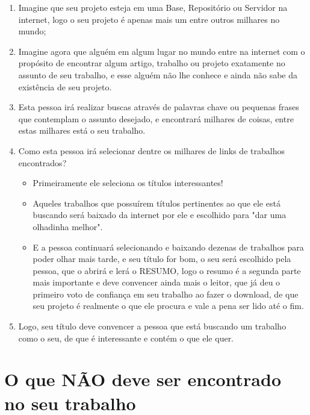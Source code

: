 \begin{enumerate}
    \item Imagine que seu projeto esteja em uma Base, Repositório ou Servidor na internet, logo o seu projeto é apenas mais um entre outros milhares no mundo;
    \item Imagine agora que alguém em algum lugar no mundo entre na internet com o propósito de encontrar algum artigo, trabalho ou projeto exatamente no assunto de seu trabalho, e esse alguém não lhe conhece e ainda não sabe da existência de seu projeto.
    \item Esta pessoa irá realizar buscas através de palavras chave ou pequenas frases que contemplam o assunto desejado, e encontrará milhares de coisas, entre estas milhares está o seu trabalho.
        
    \item Como esta pessoa irá selecionar dentre os milhares de links de trabalhos encontrados?
    \begin{itemize}
        \item Primeiramente ele seleciona os títulos interessantes!
        \item Aqueles trabalhos que possuírem títulos pertinentes ao que ele está buscando será baixado da internet por ele e escolhido para "dar uma olhadinha melhor".
        \item E a pessoa continuará selecionando e baixando dezenas de trabalhos para poder olhar mais tarde, e seu título for bom, o seu
        será escolhido pela pessoa, que o abrirá e lerá o RESUMO, logo o resumo é a segunda parte mais importante e deve convencer ainda mais o
        leitor, que já deu o primeiro voto de confiança em seu trabalho ao fazer o download, de que seu projeto é realmente o que ele procura e vale a pena ser lido até o fim.
    \end{itemize}
    \item Logo, seu título deve convencer a pessoa que está buscando um trabalho como o seu, de que é interessante e contém o que ele quer.
\end{enumerate}


\section{O que NÃO deve ser encontrado no seu trabalho}


